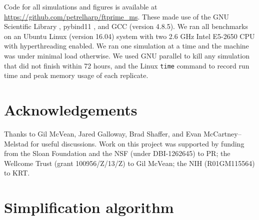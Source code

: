 \documentclass{article}
\begin{document}
Code for all simulations and figures is available at \url{https://github.com/petrelharp/ftprime_ms}.
These made use of the GNU Scientific Library \citep[version 1.16][]{galassi2018scientific},
pybind11 \citep[version 2.2.1][]{pybind11},
and GCC (version 4.8.5).
We ran all benchmarks on an Ubuntu Linux (version 16.04) system with two 2.6 GHz Intel E5-2650 CPU with
hyperthreading enabled.
We ran one simulation at a time and the machine was under minimal load otherwise.
We used GNU parallel \citep{Tange2011a} to kill any simulation that did not finish within 72 hours,
and the Linux \texttt{time} command to record run time and peak memory usage of each replicate.


\section*{Acknowledgements}
Thanks to Gil McVean, Jared Galloway, Brad Shaffer, and Evan McCartney--Melstad for useful discussions.
Work on this project was supported by funding from
the Sloan Foundation and the NSF (under DBI-1262645) to PR;
the Wellcome Trust (grant 100956/Z/13/Z) to Gil McVean;
the NIH (R01GM115564) to KRT.



\appendix

\section{Simplification algorithm}
\label{ss:simplify_algorithm}
\end{document}
